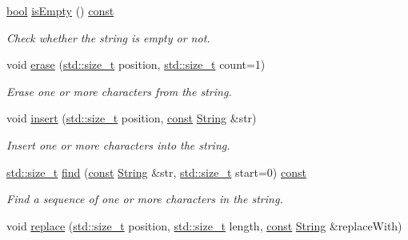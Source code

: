 \begin{DoxyCompactItemize}
\hyperlink{term__entry_8h_a002004ba5d663f149f6c38064926abac}{bool} \hyperlink{classsf_1_1_string_a6c43f0cbe84cf17fa6ba93d58b75fcdc}{is\-Empty} () \hyperlink{term__entry_8h_a57bd63ce7f9a353488880e3de6692d5a}{const} 
\begin{DoxyCompactList}\small\item\em Check whether the string is empty or not. \end{DoxyCompactList}\item 
void \hyperlink{classsf_1_1_string_aaa78a0a46b3fbe200a4ccdedc326eb93}{erase} (\hyperlink{nc__alloc_8h_a7b60c5629e55e8ec87a4547dd4abced4}{std\-::size\-\_\-t} position, \hyperlink{nc__alloc_8h_a7b60c5629e55e8ec87a4547dd4abced4}{std\-::size\-\_\-t} count=1)
\begin{DoxyCompactList}\small\item\em Erase one or more characters from the string. \end{DoxyCompactList}\item 
void \hyperlink{classsf_1_1_string_ad0b1455deabf07af13ee79812e05fa02}{insert} (\hyperlink{nc__alloc_8h_a7b60c5629e55e8ec87a4547dd4abced4}{std\-::size\-\_\-t} position, \hyperlink{term__entry_8h_a57bd63ce7f9a353488880e3de6692d5a}{const} \hyperlink{classsf_1_1_string}{String} \&str)
\begin{DoxyCompactList}\small\item\em Insert one or more characters into the string. \end{DoxyCompactList}\item 
\hyperlink{nc__alloc_8h_a7b60c5629e55e8ec87a4547dd4abced4}{std\-::size\-\_\-t} \hyperlink{classsf_1_1_string_ae1fc8d6ced3b6082853f8013ea051b5c}{find} (\hyperlink{term__entry_8h_a57bd63ce7f9a353488880e3de6692d5a}{const} \hyperlink{classsf_1_1_string}{String} \&str, \hyperlink{nc__alloc_8h_a7b60c5629e55e8ec87a4547dd4abced4}{std\-::size\-\_\-t} start=0) \hyperlink{term__entry_8h_a57bd63ce7f9a353488880e3de6692d5a}{const} 
\begin{DoxyCompactList}\small\item\em Find a sequence of one or more characters in the string. \end{DoxyCompactList}\item 
void \hyperlink{classsf_1_1_string_ad460e628c287b0fa88deba2eb0b6744b}{replace} (\hyperlink{nc__alloc_8h_a7b60c5629e55e8ec87a4547dd4abced4}{std\-::size\-\_\-t} position, \hyperlink{nc__alloc_8h_a7b60c5629e55e8ec87a4547dd4abced4}{std\-::size\-\_\-t} length, \hyperlink{term__entry_8h_a57bd63ce7f9a353488880e3de6692d5a}{const} \hyperlink{classsf_1_1_string}{String} \&replace\-With)

\end{DoxyCompactItemize}
